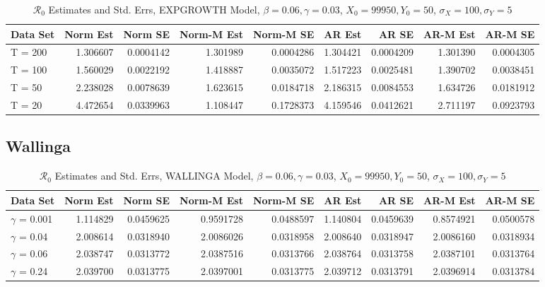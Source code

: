\message{ !name(draft_v13.tex)}\documentclass[12pt]{article}
\newcommand{\rr}{\ensuremath{\mathcal{R}_0}}
\begin{document}
\begin{table}[H]
	
	\caption{\label{tab:}$\rr$ Estimates and Std. Errs, EXPGROWTH Model,
		$\beta = 0.06, \gamma = 0.03$, $X_0 = 99950, Y_0 = 50$, $\sigma_X = 100, \sigma_Y = 5$}
	\centering
	\begin{tabular}[t]{l|r|r|r|r|r|r|r|r}
		\hline
		Data Set & Norm Est & Norm SE & Norm-M Est & Norm-M SE & AR Est & AR SE & AR-M Est & AR-M SE\\
		\hline
		T = 200 & 1.306607 & 0.0004142 & 1.301989 & 0.0004286 & 1.304421 & 0.0004209 & 1.301390 & 0.0004305\\
		\hline
		T = 100 & 1.560029 & 0.0022192 & 1.418887 & 0.0035072 & 1.517223 & 0.0025481 & 1.390702 & 0.0038451\\
		\hline
		T = 50 & 2.238028 & 0.0078639 & 1.623615 & 0.0184718 & 2.186315 & 0.0084553 & 1.634726 & 0.0181912\\
		\hline
		T = 20 & 4.472654 & 0.0339963 & 1.108447 & 0.1728373 & 4.159546 & 0.0412621 & 2.711197 & 0.0923793\\
		\hline
	\end{tabular}
\end{table}

\subsection{Wallinga}

\begin{table}[H]
	
	\caption{\label{tab:}$\rr$ Estimates and Std. Errs, WALLINGA Model,
		$\beta = 0.06, \gamma = 0.03$, $X_0 = 99950, Y_0 = 50$, $\sigma_X = 100, \sigma_Y = 5$}
	\centering
	\begin{tabular}[t]{l|r|r|r|r|r|r|r|r}
		\hline
		Data Set & Norm Est & Norm SE & Norm-M Est & Norm-M SE & AR Est & AR SE & AR-M Est & AR-M SE\\
		\hline
		$\gamma$ = 0.001 & 1.114829 & 0.0459625 & 0.9591728 & 0.0488597 & 1.140804 & 0.0459639 & 0.8574921 & 0.0500578\\
		\hline
		$\gamma$ = 0.04 & 2.008614 & 0.0318940 & 2.0086026 & 0.0318958 & 2.008640 & 0.0318947 & 2.0086160 & 0.0318934\\
		\hline
		$\gamma$ = 0.06 & 2.038747 & 0.0313772 & 2.0387516 & 0.0313766 & 2.038764 & 0.0313758 & 2.0387101 & 0.0313764\\
		\hline
		$\gamma$ = 0.24 & 2.039700 & 0.0313775 & 2.0397001 & 0.0313775 & 2.039712 & 0.0313791 & 2.0396914 & 0.0313784\\
		\hline
	\end{tabular}
\end{table}
\end{document}

